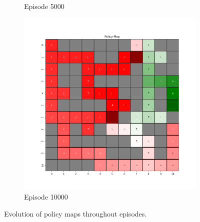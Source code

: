 \documentclass{assignment}
\begin{document}
\begin{figure}[H]
\begin{subfigure}{0.3\textwidth}
    \caption{Episode 5000}
    \end{subfigure}\hfill
    \begin{subfigure}{0.3\textwidth}
        \includegraphics[width=\textwidth]{figures/policy_q/epsilon_sweep/policy_alpha_0.1_gamma_0.95_epsilon_0.5_iteration_10000.png}
    \caption{Episode 10000}
    \end{subfigure}
    \caption{Evolution of policy maps throughout episodes.}
    \label{fig:epsilon_0.5_q_learning_policy}
\end{figure}
\end{document}
